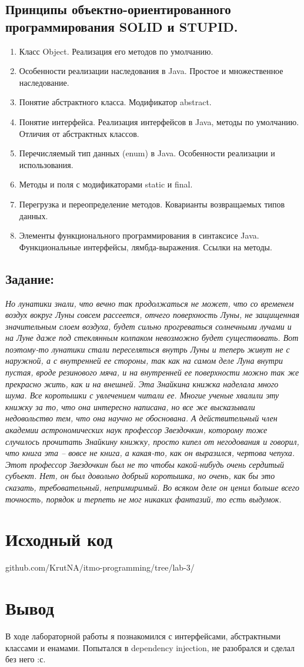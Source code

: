 \documentclass[11pt]{article}
\begin{document}
\subsection{Принципы объектно-ориентированного программирования SOLID и STUPID.}
\label{sec:org9fc26d0}
\begin{enumerate}
\item Класс Object. Реализация его методов по умолчанию.
\item Особенности реализации наследования в Java. Простое и множественное наследование.
\item Понятие абстрактного класса. Модификатор abstract.
\item Понятие интерфейса. Реализация интерфейсов в Java, методы по умолчанию. Отличия от абстрактных классов.
\item Перечисляемый тип данных (enum) в Java. Особенности реализации и использования.
\item Методы и поля с модификаторами static и final.
\item Перегрузка и переопределение методов. Коварианты возвращаемых типов данных.
\item Элементы функционального программирования в синтаксисе Java. Функциональные интерфейсы, лямбда-выражения. Ссылки на методы.
\end{enumerate}

\subsection{Задание:}
\label{sec:org19fbf9e}
\emph{Но лунатики знали, что вечно так продолжаться не может, что со временем воздух вокруг Луны совсем рассеется, отчего поверхность Луны, не защищенная значительным слоем воздуха, будет сильно прогреваться солнечными лучами и на Луне даже под стеклянным колпаком невозможно будет существовать. Вот поэтому-то лунатики стали переселяться внутрь Луны и теперь живут не с наружной, а с внутренней ее стороны, так как на самом деле Луна внутри пустая, вроде резинового мяча, и на внутренней ее поверхности можно так же прекрасно жить, как и на внешней. Эта Знайкина книжка наделала много шума. Все коротышки с увлечением читали ее. Многие ученые хвалили эту книжку за то, что она интересно написана, но все же высказывали недовольство тем, что она научно не обоснована. А действительный член академии астрономических наук профессор Звездочкин, которому тоже случилось прочитать Знайкину книжку, просто кипел от негодования и говорил, что книга эта -- вовсе не книга, а какая-то, как он выразился, чертова чепуха. Этот профессор Звездочкин был не то чтобы какой-нибудь очень сердитый субъект. Нет, он был довольно добрый коротышка, но очень, как бы это сказать, требовательный, непримиримый. Во всяком деле он ценил больше всего точность, порядок и терпеть не мог никаких фантазий, то есть выдумок.}

\section{Исходный код}
\label{sec:org2ad9e9c}
github.com/KrutNA/itmo-programming/tree/lab-3/

\section{Вывод}
\label{sec:org8331206}
В ходе лабораторной работы я познакомился с интерфейсами, абстрактными классами и енамами. Попытался в dependency injection, не разобрался и сделал без него :с.
\end{document}
